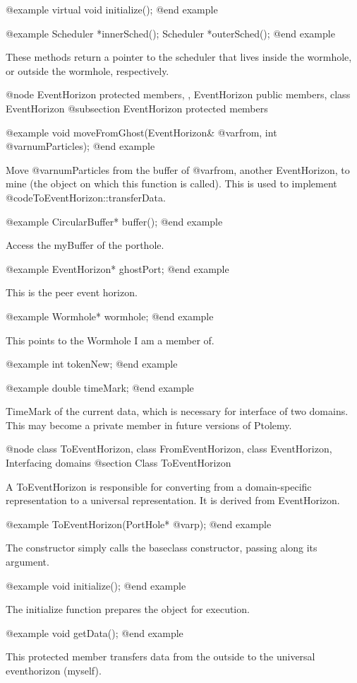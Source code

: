 @example
virtual void initialize();
@end example

@example
Scheduler *innerSched();
Scheduler *outerSched();
@end example

These methods return a pointer to the scheduler that lives inside the
wormhole, or outside the wormhole, respectively.

@node EventHorizon protected members,  , EventHorizon public members, class EventHorizon
@subsection EventHorizon protected members

@example
void moveFromGhost(EventHorizon& @var{from}, int @var{numParticles});
@end example

Move @var{numParticles} from the buffer of @var{from}, another
EventHorizon, to mine (the object on which this function is called).
This is used to implement @code{ToEventHorizon::transferData}.

@example
CircularBuffer* buffer();
@end example

Access the myBuffer of the porthole.

@example
EventHorizon* ghostPort;
@end example

This is the peer event horizon.

@example
Wormhole* wormhole;
@end example

This points to the Wormhole I am a member of.

@example
int tokenNew;
@end example

@example
double timeMark;
@end example

TimeMark of the current data, which is necessary for interface
of two domains.  This may become a private member in future versions
of Ptolemy.

@node class ToEventHorizon, class FromEventHorizon, class EventHorizon, Interfacing domains
@section Class ToEventHorizon

A ToEventHorizon is responsible for converting from a domain-specific
representation to a universal representation.  It is derived from
EventHorizon.

@example
ToEventHorizon(PortHole* @var{p});
@end example

The constructor simply calls the baseclass constructor, passing along
its argument.

@example
void initialize();
@end example

The initialize function prepares the object for execution.

@example
void getData();
@end example

This protected member transfers data from the outside to the universal
eventhorizon (myself).

